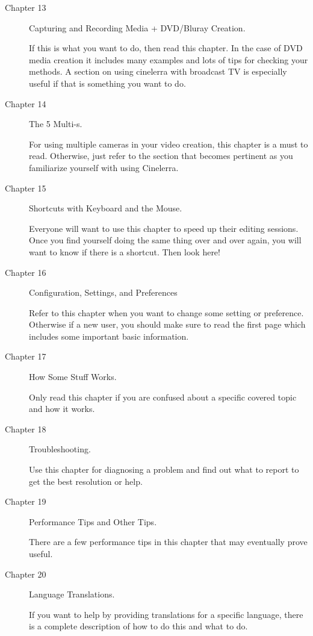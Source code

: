 \begin{description}
    \item[Chapter 13] Capturing and Recording Media + DVD/Bluray Creation.

        If this is what you want to do, then read this chapter. 
        In the case of DVD media creation it includes many examples and lots of tips for checking your methods. 
        A section on using cinelerra with broadcast TV is especially useful if that is something you want to do.

    \item[Chapter 14] The 5 Multi-s.

        For using multiple cameras in your video creation, this chapter is a must to read. Otherwise, just refer
        to the section that becomes pertinent as you familiarize yourself with using Cinelerra.

    \item[Chapter 15] Shortcuts with Keyboard and the Mouse.

        Everyone will want to use this chapter to speed up their editing sessions. 
        Once you find yourself doing the same thing over and over again, you will want to know if there is a shortcut. Then look here!  

    \item[Chapter 16] Configuration, Settings, and Preferences

        Refer to this chapter when you want to change some setting or preference. 
        Otherwise if a new user, you should make sure to read the first page which includes some important basic information.  

    \item[Chapter 17] How Some Stuff Works.

        Only read this chapter if you are confused about a specific covered topic and how it works.

    \item[Chapter 18] Troubleshooting.

        Use this chapter for diagnosing a problem and find out what to report to get the best resolution or help.

    \item[Chapter 19]  Performance Tips and Other Tips.

        There are a few performance tips in this chapter that may eventually prove useful.

    \item[Chapter 20] Language Translations.

        If you want to help by providing translations for a specific language, there is a complete description of how to do this and what to do.


\end{description}

